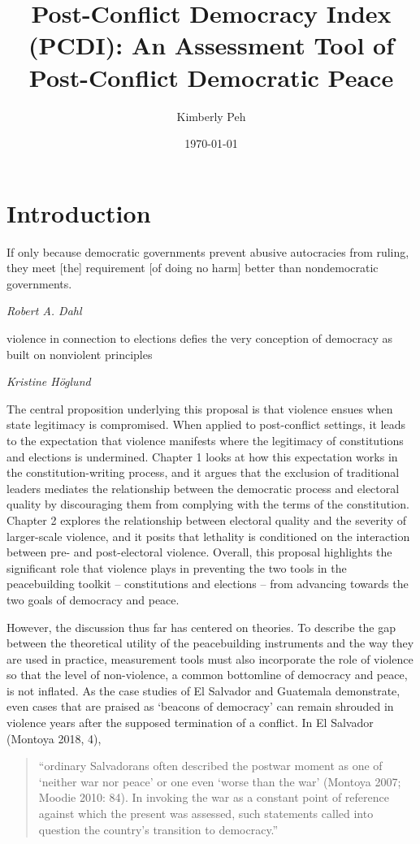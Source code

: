 \documentclass [11pt]{article}
\title{Post-Conflict Democracy Index (PCDI): An Assessment Tool of Post-Conflict Democratic Peace}
\author{Kimberly Peh}
\date{\today}
\begin{document}
\maketitle

\section*{Introduction} 
\epigraph{If only because democratic governments prevent abusive autocracies from ruling, they meet [the] requirement [of doing no harm] better than nondemocratic governments.}{\emph{Robert A. Dahl}}
\epigraph{violence in connection to elections defies the very conception of democracy as built on nonviolent principles}{\emph{Kristine Höglund}} %

The central proposition underlying this proposal is that violence ensues when state legitimacy is compromised. When applied to post-conflict settings, it leads to the expectation that violence manifests where the legitimacy of constitutions and elections is undermined. Chapter 1 looks at how this expectation works in the constitution-writing process, and it argues that the exclusion of traditional leaders mediates the relationship between the democratic process and electoral quality by discouraging them from complying with the terms of the constitution. Chapter 2 explores the relationship between electoral quality and the severity of larger-scale violence, and it posits that lethality is conditioned on the interaction between pre- and post-electoral violence. Overall, this proposal highlights the significant role that violence plays in preventing the two tools in the peacebuilding toolkit -- constitutions and elections -- from advancing towards the two goals of democracy and peace.

However, the discussion thus far has centered on theories. To describe the gap between the theoretical utility of the peacebuilding instruments and the way they are used in practice, measurement tools must also incorporate the role of violence so that the level of non-violence, a common bottomline of democracy and peace, is not inflated. As the case studies of El Salvador and Guatemala demonstrate, even cases that are praised as `beacons of democracy' can remain shrouded in violence years after the supposed termination of a conflict. In El Salvador (Montoya 2018, 4), 

\begin{quote}
\small
``ordinary Salvadorans often described the postwar moment as one of ‘neither war nor peace’ or one even ‘worse than the war’ (Montoya 2007; Moodie 2010: 84). In invoking the war as a constant point of reference against which the present was assessed, such statements called into question the country’s transition to democracy.''
\end{quote}
\end{document}
